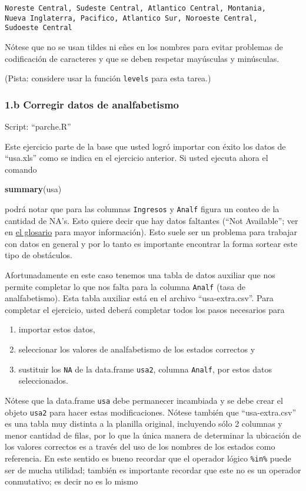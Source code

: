 \documentclass[]{article}
\newenvironment{Shaded}{}{}
\newcommand{\KeywordTok}[1]{\textcolor[rgb]{0.00,0.44,0.13}{\textbf{{#1}}}}
\newcommand{\NormalTok}[1]{{#1}}
\begin{document}
\begin{verbatim}
Noreste Central, Sudeste Central, Atlantico Central, Montania,
Nueva Inglaterra, Pacifico, Atlantico Sur, Noroeste Central,
Sudoeste Central
\end{verbatim}
Nótese que no se usan tildes ni eñes en los nombres para evitar
problemas de codificación de caracteres y que se deben respetar
mayúsculas y minúsculas.

(Pista: considere usar la función \texttt{levels} para esta tarea.)

\subsubsection{1.b Corregir datos de analfabetismo}

Script: ``parche.R''

Este ejercicio parte de la base que usted logró importar con éxito los
datos de ``usa.xls'' como se indica en el ejercicio anterior. Si usted
ejecuta ahora el comando

\begin{Shaded}
\begin{Highlighting}[]
\KeywordTok{summary}\NormalTok{(usa)}
\end{Highlighting}
\end{Shaded}
podrá notar que para las columnas \texttt{Ingresos} y \texttt{Analf}
figura un conteo de la cantidad de NA's. Esto quiere decir que hay datos
faltantes (``Not Available''; ver en
\href{http://eva.universidad.edu.uy/mod/glossary/view.php?id=116962}{el
glosario} para mayor información). Esto suele ser un problema para
trabajar con datos en general y por lo tanto es importante encontrar la
forma sortear este tipo de obstáculos.

Afortunadamente en este caso tenemos una tabla de datos auxiliar que nos
permite completar lo que nos falta para la columna \texttt{Analf} (tasa
de analfabetismo). Esta tabla auxiliar está en el archivo
``usa-extra.csv''. Para completar el ejercicio, usted deberá completar
todos los pasos necesarios para

\begin{enumerate}[1.]
\item
  importar estos datos,
\item
  seleccionar los valores de analfabetismo de los estados correctos y
\item
  sustituir los \texttt{NA} de la data.frame \texttt{usa2}, columna
  \texttt{Analf}, por estos datos seleccionados.
\end{enumerate}
Nótese que la data.frame \texttt{usa} debe permanecer incambiada y se
debe crear el objeto \texttt{usa2} para hacer estas modificaciones.
Nótese también que ``usa-extra.csv'' es una tabla muy distinta a la
planilla original, incluyendo sólo 2 columnas y menor cantidad de filas,
por lo que la única manera de determinar la ubicación de los valores
correctos es a través del uso de los nombres de los estados como
referencia. En este sentido es bueno recordar que el operador lógico
\texttt{\%in\%} puede ser de mucha utilidad; también es importante
recordar que este no es un operador conmutativo; es decir no es lo mismo
\end{document}
